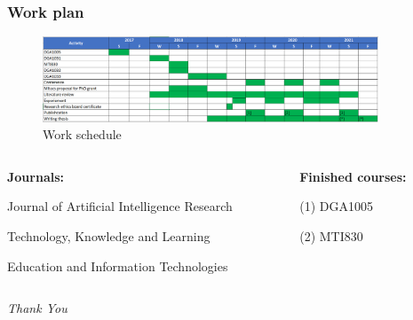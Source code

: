 \documentclass{beamer}
\begin{document}
\begin{frame}
\frametitle{Work plan}
\begin{figure}
	\includegraphics[width=100mm]{plan2.png}
	\caption{Work schedule}
\end{figure}

\begin{columns}[T]
	\begin{column}{.7\textwidth}
	\textbf{Journals:}
	\par [1] Journal of Artificial Intelligence Research 
	\par [2] Technology, Knowledge and Learning
	\par [3] Education and Information Technologies
		
	\end{column}
	\begin{column}{.3\textwidth}
	\textbf{Finished courses:}
	\par (1) DGA1005
	\par (2) MTI830

	\end{column}
\end{columns}



\end{frame}




\begin{frame}{}
\centering \Huge
\emph{Thank You}
\end{frame}
\end{document}
